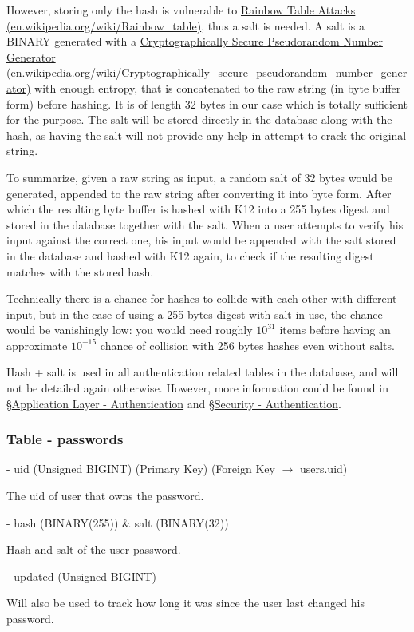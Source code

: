 \documentclass[12pt]{report}
\newcommand{\n}{\par}
\newcommand{\br}{\n\vspace{1 em}\n}
\begin{document}
However, storing only the hash is vulnerable to \href{https://en.wikipedia.org/wiki/Rainbow_table}{Rainbow Table Attacks (en.wikipedia.org\-/wiki/Rainbow\_table)},
thus a salt is needed. A salt is a BINARY generated with a
\href{https://en.wikipedia.org/wiki/Cryptographically_secure_pseudorandom_number_generator}{Cryptographically Secure Pseudorandom Number Generator (en.wikipedia.org/wiki/Cryptographically\_secure\_\-pseudorandom\_number\_generator)}
with enough entropy, that is concatenated to the raw string (in byte buffer form) before hashing.
It is of length 32 bytes in our case which is totally sufficient for the purpose.
The salt will be stored directly in the database along with the hash,
as having the salt will not provide any help in attempt to crack the original string.\n
To summarize, given a raw string as input, a random salt of 32 bytes would be generated,
appended to the raw string after converting it into byte form.
After which the resulting byte buffer is hashed with K12 into a 255 bytes digest and stored in the database together with the salt.
When a user attempts to verify his input against the correct one,
his input would be appended with the salt stored in the database and hashed with K12 again,
to check if the resulting digest matches with the stored hash.\n
Technically there is a chance for hashes to collide with each other with different input,
but in the case of using a 255 bytes digest with salt in use, the chance would be vanishingly low:
you would need roughly $10^{31}$ items before having an approximate $10^{-15}$ chance of collision with 256 bytes hashes even without salts.\n
Hash + salt is used in all authentication related tables in the database, and will not be detailed again otherwise.
However, more information could be found in
\S \hyperref[application-layer.implementation.authentication]{Application Layer - Authentication} and
\S \hyperref[security.authentication]{Security - Authentication}.

\subsubsection{Table - passwords} \label{data-layer.design.user-system.passwords}
\br
- uid (Unsigned BIGINT) (Primary Key) (Foreign Key $\rightarrow$ users.uid)\n
The uid of user that owns the password.
\br
- hash (BINARY(255)) \& salt (BINARY(32))\n
Hash and salt of the user password.
\br
- updated (Unsigned BIGINT)\n
Will also be used to track how long it was since the user last changed his password.
\end{document}
